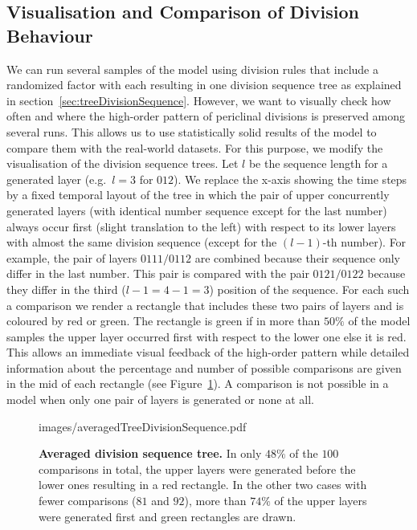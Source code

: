 \documentclass[11pt,a4paper, draft]{article}
\begin{document}
\subsection{Visualisation and Comparison of Division Behaviour}
\noindent
We can run several samples of the model using division rules that include a randomized factor with each resulting in one division sequence tree as explained in section~\ref{sec:treeDivisionSequence}. However, we want to visually check how often and where the high-order pattern of periclinal divisions is preserved among several runs. This allows us to use statistically solid results of the model to compare them with the real-world datasets. For this purpose, we modify the visualisation of the division sequence trees. Let $l$ be the sequence length for a generated layer (e.g.\ $l=3$ for $012$). We replace the x-axis showing the time steps by a fixed temporal layout of the tree in which the pair of upper concurrently generated layers (with identical number sequence except for the last number) always occur first (slight translation to the left) with respect to its lower layers with almost the same division sequence (except for the $(l-1)$-th number). For example, the pair of layers $0111/0112$ are combined because their sequence only differ in the last number. This pair is compared with the pair $0121/0122$ because they differ in the third ($l-1 = 4-1 = 3$) position of the sequence. For each such a comparison we render a rectangle that includes these two pairs of layers and is coloured by red or green. The rectangle is green if in more than $50 \%$ of the model samples the upper layer occurred first with respect to the lower one else it is red. This allows an immediate visual feedback of the high-order pattern while detailed information about the percentage and number of possible comparisons are given in the mid of each rectangle (see Figure~\ref{fig:averagedTreeDivisionSequence}). A comparison is not possible in a model when only one pair of layers is generated or none at all.
%
\begin{figure}[htbp]
	\begin{center}
		\begin{overpic}[width=0.5\linewidth]{images/averagedTreeDivisionSequence.pdf}
		\end{overpic}
\caption[Averaged division sequence tree.]
{
{\bf Averaged division sequence tree.} In only $48 \%$ of the $100$ comparisons in total, the upper layers were generated before the lower ones resulting in a red rectangle. In the other two cases with fewer comparisons ($81$ and $92$), more than $74 \%$ of the upper layers were generated first and green rectangles are drawn.
}
	\label{fig:averagedTreeDivisionSequence}
	\end{center}
\end{figure}
%
\end{document}
